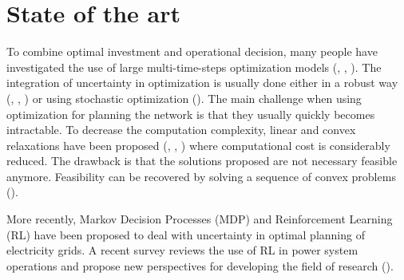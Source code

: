 \section{State of the art}
\label{sec:stateart}

To combine optimal investment and operational decision, many people have investigated the use of large multi-time-steps optimization models (\cite{zonal_int}, \cite{Baker2012OptimalIO}, \cite{paolone}).
The integration of uncertainty in optimization is usually done either in a robust way (\cite{LorcaSun}, \cite{adaptative}, \cite{BM2}) or using stochastic optimization (\cite{Oren}). 
The main challenge when using optimization for planning the network is that they usually quickly becomes intractable. 
To decrease the computation complexity, linear and convex relaxations have been proposed (\cite{Farivar_Relax1}, \cite{Farivar_Relax2}, \cite{BM1}) where computational cost is considerably reduced. 
The drawback is that the solutions proposed are not necessary feasible anymore. 
Feasibility can be recovered by solving a sequence of convex problems (\cite{Nali}). 

More recently, Markov Decision Processes (MDP) and Reinforcement Learning (RL) have been proposed to deal with uncertainty in optimal planning of electricity grids. 
A recent survey reviews the use of RL in power system operations and propose new perspectives for developing the field of research (\cite{RLSurvey}).

